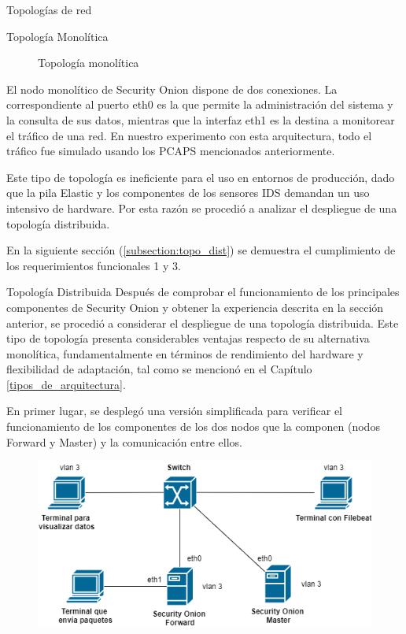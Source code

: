 \begin{section}{Topologías de red }
\begin{subsection} {Topología Monolítica}
\begin{figure}[H]
            \caption{Topología monolítica}
            \label{fig:figura_33_a}
            \end{figure}
            El nodo monolítico de Security Onion dispone de dos conexiones. La correspondiente al puerto eth0 es la que permite la administración del sistema y la consulta de sus datos, mientras que la interfaz eth1 es la destina a monitorear el tráfico de una red. En nuestro experimento con esta arquitectura, todo el tráfico fue simulado usando los PCAPS mencionados anteriormente. \par
            Este tipo de topología es ineficiente para el uso en entornos de producción, dado que la pila Elastic y los componentes de los sensores IDS demandan un uso intensivo de hardware. Por esta razón se procedió a analizar el despliegue de una topología distribuida.
            \par
            En la siguiente sección (\ref{subsection:topo_dist}) se demuestra el cumplimiento de los requerimientos funcionales 1 y 3.
        \end{subsection}
        \begin{subsection} {Topología Distribuida}
        \label{subsection:topo_dist}
            Después de comprobar el funcionamiento de los principales componentes de Security Onion y obtener la experiencia descrita en la sección anterior, se procedió a considerar el despliegue de una topología distribuida. Este tipo de topología presenta considerables ventajas respecto de su alternativa monolítica, fundamentalmente en términos de rendimiento del hardware y flexibilidad de adaptación, tal como se mencionó en el Capítulo  \ref{tipos_de_arquitectura}. \par
            En primer lugar, se desplegó una versión simplificada para verificar el funcionamiento de los componentes de los dos nodos que la componen (nodos Forward y Master) y la comunicación entre ellos.\par
            \begin{figure}[h]
                \centering
                \includegraphics[width=1\textwidth]{./iteracion_1_imagenes/figura_33_b_topologia_de_prueba_2.png}

\end{figure}
\end{subsection}
\end{section}
